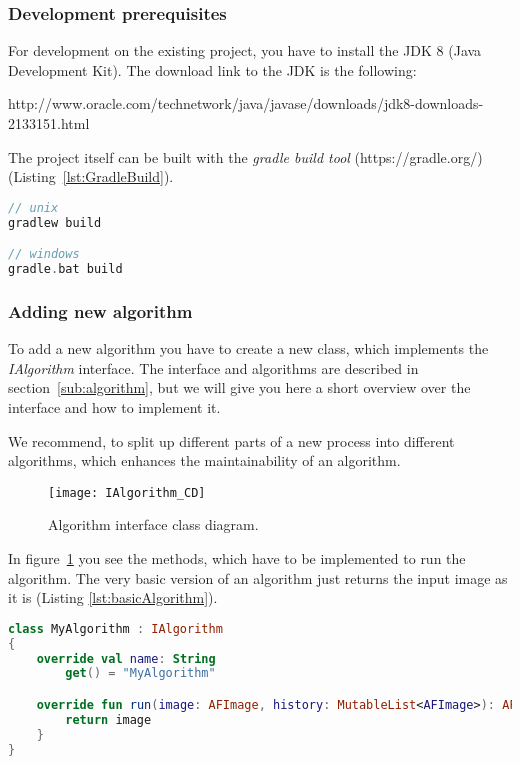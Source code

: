 \subsubsection{Development prerequisites}
For development on the existing project, you have to install the JDK 8 (Java Development Kit). The download link to the JDK is the following:

http://www.oracle.com/technetwork/java/javase/downloads/jdk8-downloads-2133151.html

The project itself can be built with the \textit{gradle build tool} (https://gradle.org/) (Listing~\ref{lst:GradleBuild}).

\begin{lstlisting}[caption={Gradle build tool build of the project.}, label={lst:GradleBuild}, language=Kotlin]
// unix
gradlew build

// windows
gradle.bat build
\end{lstlisting}

\subsubsection{Adding new algorithm}
To add a new algorithm you have to create a new class, which implements the \textit{IAlgorithm} interface. The interface and algorithms are described in section~\ref{sub:algorithm}, but we will give you here a short overview over the interface and how to implement it.

We recommend, to split up different parts of a new process into different algorithms, which enhances the maintainability of an algorithm.

\begin{figure}[H]
  \centering
      \texttt{[image: IAlgorithm\_CD]}
  \caption{Algorithm interface class diagram.}
  \label{fig:IAlgorithm_CD_DG}
\end{figure}

In figure~\ref{fig:IAlgorithm_CD_DG} you see the methods, which have to be implemented to run the algorithm. The very basic version of an algorithm just returns the input image as it is (Listing \ref{lst:basicAlgorithm}).

\begin{lstlisting}[caption={Basic version of an algorithm.}, label={lst:basicAlgorithm}, language=Kotlin]
class MyAlgorithm : IAlgorithm
{
    override val name: String
        get() = "MyAlgorithm"

    override fun run(image: AFImage, history: MutableList<AFImage>): AFImage {
        return image
    }
}
\end{lstlisting}

